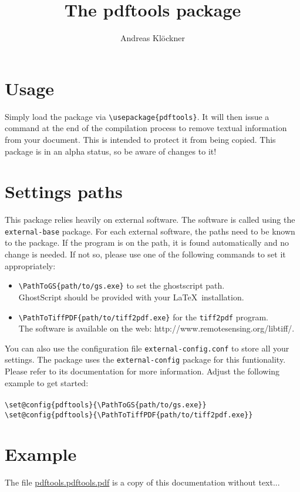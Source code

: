 \documentclass{article}
\title{The pdftools package}
\author{Andreas Kl\"ockner}
\begin{document}
  \maketitle

\section{Usage}
Simply load the package via \lstinline!\usepackage{pdftools}!. It will then issue a command at the end of the compilation process to remove textual information from your document. This is intended to protect it from being copied. This package is in an alpha status, so be aware of changes to it!

\section{Settings paths}
This package relies heavily on external software. The software is called using the \lstinline!external-base! package. For each external software, the paths need to be known to the package. If the program is on the path, it is found automatically and no change is needed. If not so, please use one of the following commands to set it appropriately:
\begin{itemize}
	\item \lstinline!\PathToGS{path/to/gs.exe}! to set the ghostscript path.\\
	      GhostScript should be provided with your \LaTeX~installation.
	\item \lstinline!\PathToTiffPDF{path/to/tiff2pdf.exe}! for the \lstinline!tiff2pdf! program.\\
	      The software is available on the web: http://www.remotesensing.org/libtiff/.
\end{itemize}

You can also use the configuration file \lstinline!external-config.conf! to store all your settings. The package uses the \lstinline!external-config! package for this funtionality. Please refer to its documentation for more information. Adjust the following example to get started:\\\\
\lstinline!\set@config{pdftools}{\PathToGS{path/to/gs.exe}}!\\
\lstinline!\set@config{pdftools}{\PathToTiffPDF{path/to/tiff2pdf.exe}}!


\section{Example}
The file \href{run:./pdftools.pdftools.pdf}{pdftools.pdftools.pdf} is a copy of this documentation without text...
\end{document}
